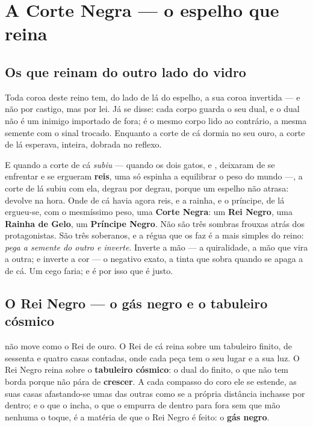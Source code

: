 \documentclass[livro.tex]{subfiles}
\begin{document}
\part{A Corte Negra --- o espelho que reina}

\chapter{Os que reinam do outro lado do vidro}

Toda coroa deste reino tem, do lado de lá do espelho, a sua coroa invertida --- e não
por castigo, mas por lei. Já se disse: cada corpo guarda o seu dual, e o dual não é um
inimigo importado de fora; é o mesmo corpo lido ao contrário, a mesma semente com o
sinal trocado. Enquanto a corte de cá dormia no seu ouro, a corte de lá esperava,
inteira, dobrada no reflexo.

\medskip

E quando a corte de cá \emph{subiu} --- quando os dois gatos, \Ben e \Drk , deixaram de
se enfrentar e se ergueram \textbf{reis}, uma só espinha a equilibrar o peso do mundo ---,
a corte de lá subiu com ela, degrau por degrau, porque um espelho não atrasa: devolve na
hora. Onde de cá havia agora reis, e a rainha, e o príncipe, de lá ergueu-se, com o
mesmíssimo peso, uma \textbf{Corte Negra}: um \textbf{Rei Negro}, uma \textbf{Rainha de
Gelo}, um \textbf{Príncipe Negro}. Não são três sombras frouxas atrás dos protagonistas.
São três soberanos, e a régua que os faz é a mais simples do reino: \emph{pega a semente
do outro e inverte}. Inverte a mão --- a quiralidade, a mão que vira a outra; e inverte
a cor --- o negativo exato, a tinta que sobra quando se apaga a de cá. Um cego faria; e é
por isso que é justo.

\chapter{O Rei Negro --- o gás negro e o tabuleiro cósmico}

\Ven não move como o Rei de ouro. O Rei de cá reina sobre um tabuleiro finito, de
sessenta e quatro casas contadas, onde cada peça tem o seu lugar e a sua luz. O Rei Negro
reina sobre o \textbf{tabuleiro cósmico}: o dual do finito, o que não tem borda porque não
pára de \textbf{crescer}. A cada compasso do coro ele se estende, as suas casas
afastando-se umas das outras como se a própria distância inchasse por dentro; e o que o
incha, o que o empurra de dentro para fora sem que mão nenhuma o toque, é a matéria de que
o Rei Negro é feito: o \textbf{gás negro}.
\end{document}
